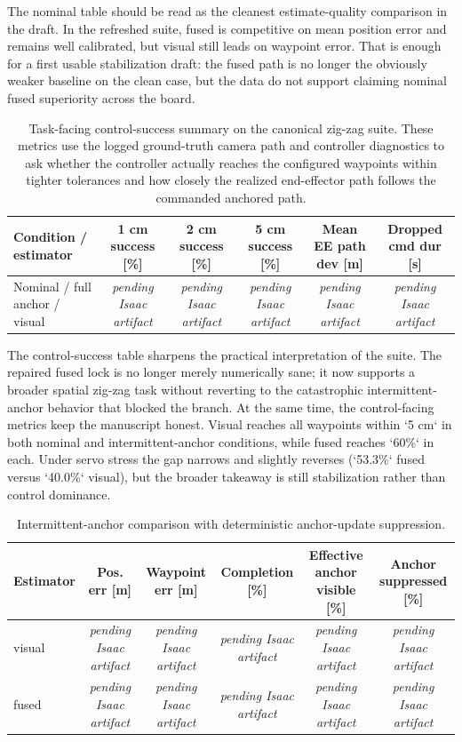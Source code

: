 \documentclass[11pt]{article}
\newcommand{\ArtifactPending}{\textit{pending Isaac artifact}}
\newcommand{\IsaacSecondPassDropoutRows}{%
visual & \ArtifactPending{} & \ArtifactPending{} & \ArtifactPending{} & \ArtifactPending{} & \ArtifactPending{} \\
fused & \ArtifactPending{} & \ArtifactPending{} & \ArtifactPending{} & \ArtifactPending{} & \ArtifactPending{} \\
}
\newcommand{\IsaacSecondPassControlSuccessRows}{%
Nominal / full anchor / visual & \ArtifactPending{} & \ArtifactPending{} & \ArtifactPending{} & \ArtifactPending{} & \ArtifactPending{} \\
}
\begin{document}
The nominal table should be read as the cleanest estimate-quality comparison in the draft. In the refreshed suite, fused is competitive on mean position error and remains well calibrated, but visual still leads on waypoint error. That is enough for a first usable stabilization draft: the fused path is no longer the obviously weaker baseline on the clean case, but the data do not support claiming nominal fused superiority across the board.

\begin{table}[H]
\centering
\caption{Task-facing control-success summary on the canonical zig-zag suite. These metrics use the logged ground-truth camera path and controller diagnostics to ask whether the controller actually reaches the configured waypoints within tighter tolerances and how closely the realized end-effector path follows the commanded anchored path.}
\begin{tabular}{lccccc}
\toprule
Condition / estimator & 1 cm success [\%] & 2 cm success [\%] & 5 cm success [\%] & Mean EE path dev [m] & Dropped cmd dur [s] \\
\midrule
\IsaacSecondPassControlSuccessRows
\bottomrule
\end{tabular}
\end{table}

The control-success table sharpens the practical interpretation of the suite. The repaired fused lock is no longer merely numerically sane; it now supports a broader spatial zig-zag task without reverting to the catastrophic intermittent-anchor behavior that blocked the branch. At the same time, the control-facing metrics keep the manuscript honest. Visual reaches all waypoints within `5 cm` in both nominal and intermittent-anchor conditions, while fused reaches `60\%` in each. Under servo stress the gap narrows and slightly reverses (`53.3\%` fused versus `40.0\%` visual), but the broader takeaway is still stabilization rather than control dominance.

\begin{table}[H]
\centering
\caption{Intermittent-anchor comparison with deterministic anchor-update suppression.}
\begin{tabular}{lccccc}
\toprule
Estimator & Pos. err [m] & Waypoint err [m] & Completion [\%] & Effective anchor visible [\%] & Anchor suppressed [\%] \\
\midrule
\IsaacSecondPassDropoutRows
\bottomrule
\end{tabular}
\end{table}
\end{document}
